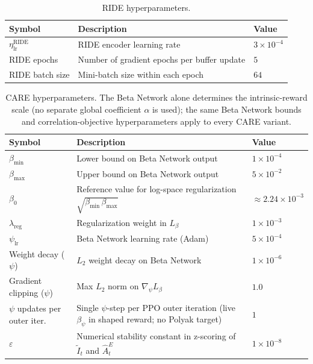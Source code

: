 \begin{table}[H]
\centering
\caption{RIDE hyperparameters.}
\label{tab:ride_hparams}
\begin{tabular}{|l|l|l|}
\hline
\textbf{Symbol} & \textbf{Description} & \textbf{Value} \\
\hline
$\eta_\text{lr}^\text{RIDE}$ & RIDE encoder learning rate & $3 \times 10^{-4}$ \\
\hline
RIDE epochs & Number of gradient epochs per buffer update & $5$ \\
\hline
RIDE batch size & Mini-batch size within each epoch & $64$ \\
\hline
\end{tabular}
\end{table}

\begin{table}[H]
\centering
\caption[CARE hyperparameters.]{CARE hyperparameters. The Beta Network alone determines the intrinsic-reward scale (no separate global coefficient $\alpha$ is used); the same Beta Network bounds and correlation-objective hyperparameters apply to every CARE variant.}
\label{tab:care_hparams}
\begin{tabular}{|l|p{7.5cm}|l|}
\hline
\textbf{Symbol} & \textbf{Description} & \textbf{Value} \\
\hline
$\beta_\text{min}$ & Lower bound on Beta Network output & $1 \times 10^{-4}$ \\
\hline
$\beta_\text{max}$ & Upper bound on Beta Network output & $5 \times 10^{-2}$ \\
\hline
$\beta_0$ & Reference value for log-space regularization $\sqrt{\beta_\text{min}\,\beta_\text{max}}$ & $\approx 2.24 \times 10^{-3}$ \\
\hline
$\lambda_\text{reg}$ & Regularization weight in $L_\beta$ & $1 \times 10^{-3}$ \\
\hline
$\psi_\text{lr}$ & Beta Network learning rate (Adam) & $5 \times 10^{-4}$ \\
\hline
Weight decay ($\psi$) & $L_2$ weight decay on Beta Network & $1 \times 10^{-6}$ \\
\hline
Gradient clipping ($\psi$) & Max $L_2$ norm on $\nabla_\psi L_\beta$ & $1.0$ \\
\hline
$\psi$ updates per outer iter. & Single $\psi$-step per PPO outer iteration (live $\beta_\psi$ in shaped reward; no Polyak target) & $1$ \\
\hline
$\varepsilon$ & Numerical stability constant in z-scoring of $\tilde I_t$ and $\hat A_t^{E}$ & $1 \times 10^{-8}$ \\
\hline
\end{tabular}
\end{table}

